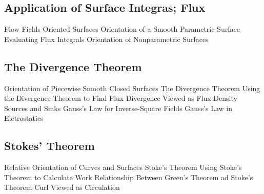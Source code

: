 \documentclass[]{article}
\begin{document}
\subsection{Application of Surface Integras; Flux}
Flow Fields
Oriented Surfaces
Orientation of a Smooth Parametric Surface
Evaluating Flux Integrals
Orientation of Nonparametric Surfaces
\subsection{The Divergence Theorem}
Orientation of Piecewise Smooth Closed Surfaces
The Divergence Theorem
Using the Divergence Theorem to Find Flux
Divergence Viewed as Flux Density
Sources and Sinks
Gauss's Law for Inverse-Square Fields
Gauss's Law in Eletrostatics
\subsection{Stokes' Theorem}
Relative Orientation of Curves and Surfaces
Stoke's Theorem
Using Stoke's Theorem to Calculate Work
Relationship Between Green's Theorem ad Stoke's Theorem
Curl Viewed as Circulation
\end{document}
